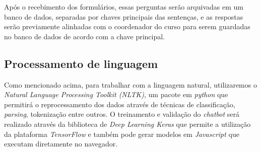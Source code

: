 \documentclass[
	12pt,				%
	oneside,
	a4paper,			%
	english,			%
	french,				%
	spanish,			%
	brazil				%
	]{abntex2}
\begin{document}
Após o recebimento dos formulários, essas perguntas serão arquivadas em um banco de dados, separadas por chaves principais das sentenças, e as respostas serão previamente alinhadas com o coordenador do curso para serem guardadas no banco de dados de acordo com a chave principal.

\subsection{Processamento de linguagem}

Como mencionado acima, para trabalhar com a linguagem natural, utilizaremos  o \emph{Natural Language Processing Toolkit (NLTK)}, um pacote em \emph{python} que permitirá o reprocessamento dos dados através de técnicas de classificação, \emph{parsing}, tokenização entre outros.
O treinamento e validação do \emph{chatbot} será realizado através da biblioteca de \emph{Deep Learning Keras} que permite a utilização da plataforma \emph{TensorFlow} e também pode gerar modelos em \emph{Javascript} que executam diretamente no navegador. 





\end{document}
